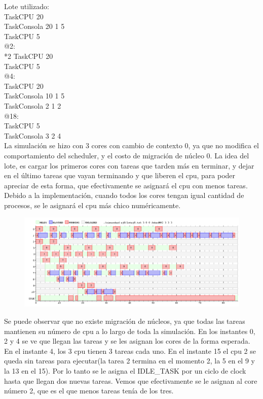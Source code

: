 Lote utilizado:\\

\noindent TaskCPU 20		\\
TaskConsola 20 1 5	\\
TaskCPU 5\\
@2: \\
*2 TaskCPU 20\\
TaskCPU 5\\
@4:\\
TaskCPU 20\\
TaskConsola 10 1 5\\
TaskConsola 2 1 2\\
@18:	\\			
TaskCPU 5\\
TaskConsola 3 2 4\\

La simulación se hizo con 3 cores con cambio de contexto 0, ya que no modifica el comportamiento del scheduler, y el costo de migración de núcleo 0.
La idea del lote, es cargar los primeros cores con tareas que tarden más en terminar, y dejar en el último tareas que vayan terminando y que liberen el cpu, para poder apreciar de esta forma, que efectivamente se asignará el cpu con menos tareas.
Debido a la implementación, cuando todos los cores tengan igual cantidad de procesos, se le asignará el cpu más chico numéricamente. 

\newpage

\begin{figure}[h]
  \includegraphics[width=\textwidth]{../ej8/rr2.png}
  \caption{}
\end{figure}

Se puede observar que no existe migración de núcleos, ya que todas las tareas mantienen su número de cpu a lo largo de toda la simulación.
En los instantes 0, 2 y 4 se ve que llegan las tareas y se les asignan los cores de la forma esperada. En el instante 4, los 3 cpu tienen 3 tareas cada uno. En el instante 15 el cpu 2 se queda sin tareas para ejecutar(la tarea 2 termina en el momento 2, la 5 en el 9 y la 13 en el 15). Por lo tanto se le asigna el IDLE_TASK por un ciclo de clock hasta que llegan dos nuevas tareas. Vemos que efectivamente se le asignan al core número 2, que es el que menos tareas tenía de los tres. \\



